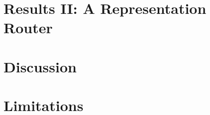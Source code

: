 \documentclass[letterpaper]{article}
\begin{document}
\section{Results II: A Representation Router}\label{sec:router}

\section{Discussion}\label{sec:discussion}

\section{Limitations}\label{sec:limitations}




\end{document}
